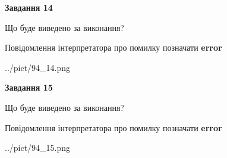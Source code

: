 \documentclass[11pt, ukrainian]{article}
\begin{document}
{\begin {large}
{\begin {center}\textbf{Завдання 14}\end {center}}\par
Що буде виведено за виконання? \par
Повідомлення інтерпретатора про помилку позначати \textbf{error}

\begin{center}
	{../pict/94_14.png}
\end{center}
\newpage

{\begin {center}\textbf{Завдання 15}\end {center}}\par
Що буде виведено за виконання? \par
Повідомлення інтерпретатора про помилку позначати \textbf{error}

\begin{center}
	{../pict/94_15.png}
\end{center}
\newpage

\end {large}}
\end{document}
